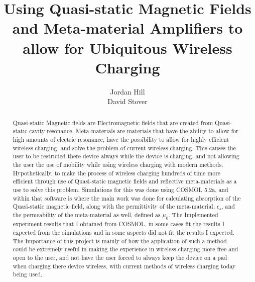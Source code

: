 \documentclass[]{article}
\title{Using Quasi-static Magnetic Fields and Meta-material Amplifiers to allow for Ubiquitous Wireless Charging}
\author{Jordan Hill \\ David Stover}
\begin{document}
	
\maketitle

\pagebreak

\begin{abstract}
Quasi-static Magnetic fields are Electromagnetic fields that are created from Quasi-static cavity resonance. Meta-materials are materials that have the ability to allow for high amounts of electric resonance, have the possibility to allow for highly efficient wireless charging, and solve the problem of current wireless charging. This causes the user to be restricted there device always while the device is charging, and not allowing the user the use of mobility while using wireless charging with modern methods. Hypothetically, to make the process of wireless charging hundreds of time more efficient through use of Quasi-static magnetic fields and reflective meta-materials as a use to solve this problem. Simulations for this was done using COSMOL 5.2a, and within that software is where the main work was done for calculating absorption of the Quasi-static magnetic field, along with the permittivity of the meta-material, $\epsilon_s$, and the permeability of the meta-material as well, defined as $\mu_0$. The Implemented experiment results that I obtained from COSMOL, in some cases fit the results I expected from the simulations and in some aspects did not fit the results I expected. The Importance of this project is mainly of how the application of such a method could be extremely useful in making the experience in wireless charging more free and open to the user, and not have the user forced to always keep the device on a pad when charging there device wireless, with current methods of wireless charging today being used.
\end{abstract}

\pagebreak
\end{document}
